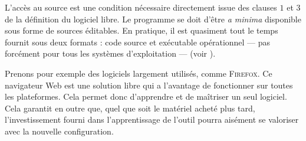L'accès au \gls{source} est une condition nécessaire directement is\-sue des clauses $1$ et $3$ de la définition du logiciel libre. Le programme se doit d'être \textit{a minima} disponible sous forme de sources éditables. En pratique, il est quasiment tout le temps fournit sous deux formats : code source et exécutable opérationnel --- pas forcément pour tous les systèmes d'exploitation --- (voir ).


%
Prenons pour exemple des logiciels largement utilisés, comme \textsc{Firefox}. Ce navigateur Web est une solution libre qui a l'avantage de fonctionner sur toutes les plateformes. Cela permet donc d'apprendre et de maîtriser un seul logiciel. 
Cela garantit en outre que, quel que soit le matériel acheté plus tard, l'investissement fourni dans l'apprentissage de l'outil pourra aisément se valoriser avec la nouvelle configuration.

